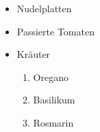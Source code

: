 \begin{itemize}
  \item Nudelplatten
  \item Passierte Tomaten
  \item Kräuter \begin{enumerate}
    \item Oregano
    \item Basilikum
    \item Rosmarin
  \end{enumerate}
\end{itemize}
